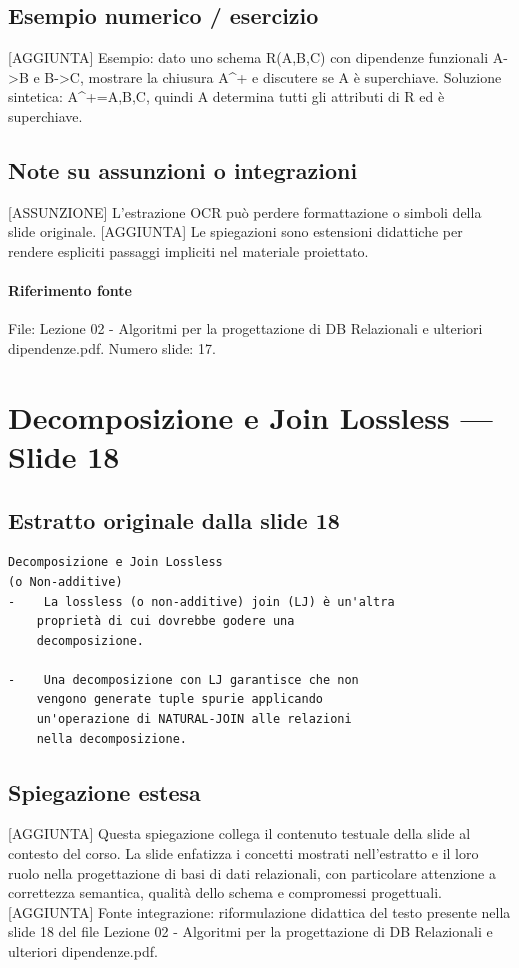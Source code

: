\documentclass[11pt]{article}
\begin{document}
\subsection*{Esempio numerico / esercizio}
[AGGIUNTA] Esempio: dato uno schema R(A,B,C) con dipendenze funzionali A->B e B->C, mostrare la chiusura A^+ e discutere se A è superchiave. Soluzione sintetica: A^+={A,B,C}, quindi A determina tutti gli attributi di R ed è superchiave.
\subsection*{Note su assunzioni o integrazioni}
[ASSUNZIONE] L'estrazione OCR può perdere formattazione o simboli della slide originale.
[AGGIUNTA] Le spiegazioni sono estensioni didattiche per rendere espliciti passaggi impliciti nel materiale proiettato.
\paragraph{Riferimento fonte} File: Lezione 02 - Algoritmi per la progettazione di DB Relazionali e ulteriori dipendenze.pdf. Numero slide: 17.
\section{Decomposizione e Join Lossless --- Slide 18}
\subsection*{Estratto originale dalla slide 18}
\begin{lstlisting}
Decomposizione e Join Lossless
(o Non-additive)
-    La lossless (o non-additive) join (LJ) è un'altra
    proprietà di cui dovrebbe godere una
    decomposizione.

-    Una decomposizione con LJ garantisce che non
    vengono generate tuple spurie applicando
    un'operazione di NATURAL-JOIN alle relazioni
    nella decomposizione.
\end{lstlisting}
\subsection*{Spiegazione estesa}
[AGGIUNTA] Questa spiegazione collega il contenuto testuale della slide al contesto del corso. La slide enfatizza i concetti mostrati nell'estratto e il loro ruolo nella progettazione di basi di dati relazionali, con particolare attenzione a correttezza semantica, qualità dello schema e compromessi progettuali.
[AGGIUNTA] Fonte integrazione: riformulazione didattica del testo presente nella slide 18 del file Lezione 02 - Algoritmi per la progettazione di DB Relazionali e ulteriori dipendenze.pdf.
\end{document}
